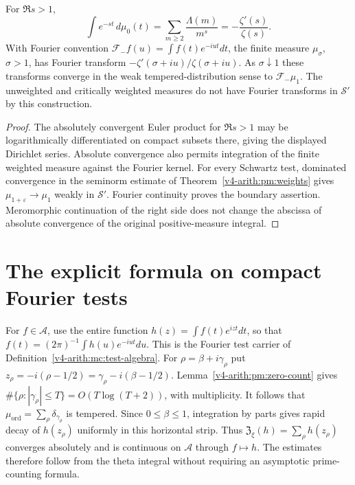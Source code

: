 \begin{proposition}
\label{v4-arith:pm:laplace}
For $\Re s>1$,
\[
 \int e^{-st}\,d\mu_0(t)
 =\sum_{m\geq2}\frac{\Lambda(m)}{m^s}
 =-\frac{\zeta'(s)}{\zeta(s)}.
\]
With Fourier convention $\mathcal F_-f(u)=\int f(t)e^{-iut}dt$,
the finite measure $\mu_\sigma$, $\sigma>1$, has Fourier transform
$-\zeta'(\sigma+iu)/\zeta(\sigma+iu)$.
As $\sigma\downarrow1$ these transforms converge in the weak
tempered-distribution sense to $\mathcal F_-\mu_1$.
The unweighted and critically weighted measures do not have Fourier
transforms in $\mathscr S'$ by this construction.
\end{proposition}
\begin{proof}
The absolutely convergent Euler product for $\Re s>1$ may be
logarithmically differentiated on compact subsets there, giving
the displayed Dirichlet series. Absolute convergence also permits
integration of the finite weighted measure against the Fourier
kernel. For every Schwartz test, dominated convergence in the
seminorm estimate of Theorem~\ref{v4-arith:pm:weights} gives
$\mu_{1+\varepsilon}\to\mu_1$ weakly in $\mathscr S'$.
Fourier continuity proves the boundary assertion. Meromorphic
continuation of the right side does not change the abscissa of
absolute convergence of the original positive-measure integral.
\end{proof}

\section{The explicit formula on compact Fourier tests}
\label{v4-arith:pm:explicit-section}

For $f\in\mathscr A$, use the entire function
$h(z)=\int f(t)e^{izt}dt$, so that
$f(t)=(2\pi)^{-1}\int h(u)e^{-iut}du$.
This is the Fourier test carrier of
Definition~\ref{v4-arith:mc:test-algebra}.
For $\rho=\beta+i\gamma_\rho$ put
$z_\rho=-i(\rho-1/2)=\gamma_\rho-i(\beta-1/2)$.
Lemma~\ref{v4-arith:pm:zero-count} gives
$\#\{\rho:|\gamma_\rho|\leq T\}=O(T\log(T+2))$, with multiplicity.
It follows that $\mu_{\mathrm{ord}}=\sum_\rho\delta_{\gamma_\rho}$
is tempered. Since $0\leq\beta\leq1$, integration by parts gives rapid
decay of $h(z_\rho)$ uniformly in this horizontal strip.
Thus $\mathfrak Z_\xi(h)=\sum_\rho h(z_\rho)$ converges absolutely
and is continuous on $\mathscr A$ through $f\mapsto h$.
The estimates therefore follow from the theta integral without
requiring an asymptotic prime-counting formula.

